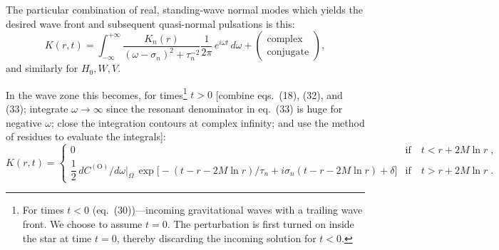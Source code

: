 The particular combination of real, standing-wave normal modes which yields the desired wave front and subsequent quasi-normal pulsations is this:
%
\begin{equation}
  K(r,t) = \int_{-\infty}^{+\infty}
    \frac{K_{n}(r)}{(\omega - \sigma_{n})^{2} + \tau_{n}^{-2}}
    \frac{1}{2\pi}\,e^{i\omega t}\,d\omega
  + \begin{pmatrix} \text{complex} \\ \text{conjugate} \end{pmatrix} ,
  \label{eq:33}
\end{equation}
%
and similarly for $H_{0}, W, V$.

In the wave zone this becomes, for times\footnote{For times $t < 0$ (eq.\ (30))---incoming gravitational waves
with a trailing wave front. We choose to assume $t = 0$. The perturbation is first turned on inside the star
at time $t = 0$, thereby discarding the incoming solution for $t < 0$.} $t > 0$ [combine eqs.\ (18), (32), and (33); integrate $\omega \to \infty$ since the resonant denominator in eq.\ (33) is huge for negative
$\omega$; close the integration contours at complex infinity; and use the method of residues to
evaluate the integrals]:
%
\begin{equation}
  K(r,t)
  = \begin{cases}
      0 & \text{if} \quad t < r + 2M\ln r \;, \\[4pt]
      \dfrac{1}{2}\,dC^{(\mathrm{O})}/d\omega\big|_{\Omega}\,
        \exp\!\bigl[-(t - r - 2M\ln r)/\tau_{n} + i\sigma_{n}(t - r - 2M\ln r) + \delta\bigr]
      & \text{if} \quad t > r + 2M\ln r \;.
    \end{cases}
  \tag{34a}
\end{equation}
